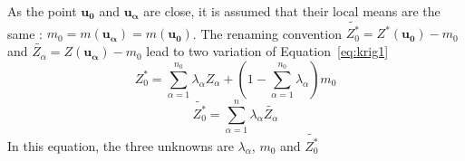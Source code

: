 \documentclass[twocolumn]{article}
\numberwithin{equation}{section}
\begin{document}
As the point $\boldsymbol{u_0}$ and $\boldsymbol{u_\alpha}$ are close, it is assumed that their local means are the same : $m_0 = m(\boldsymbol{u_\alpha}) = m(\boldsymbol{u_0})$. The renaming convention $\tilde{Z^*_0} =  Z^* (\boldsymbol{u_0})-m_0$ and $ \tilde{Z_\alpha} =Z(\boldsymbol{u_\alpha}) - m_0$ lead to two variation of Equation~\ref{eq:krig1}
\begin{equation} \label{eq:krig2}
	 Z_0^* =  \sum_{\alpha=1}^{n_0}\lambda_\alpha Z_\alpha + \left( 1- \sum_{\alpha=1}^{n_0} \lambda_\alpha\right) m_0
\end{equation}
\begin{equation} \label{eq:krig3}
	\tilde{Z^*_0} = \sum_{\alpha=1}^n \lambda_\alpha \tilde{Z_\alpha} 
\end{equation}
In this equation, the three unknowns are $\lambda_\alpha$, $m_0$ and $\tilde{Z^*_0}$
\end{document}
